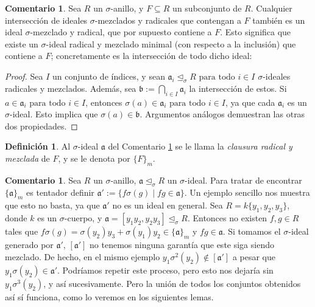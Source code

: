\documentclass[letterpaper]{article}
\def\fa{\text{ para todo }}
\def\a{\mathfrak{a}}
\def\b{\mathfrak{b}}
\def\s{\sigma}
\def\si{\unlhd_{\sigma}}
\theoremstyle{definition}
\newtheorem{rem}[Satz]{Comentario}
\newtheorem{defn}[Satz]{Definici\'on}
\begin{document}
\begin{rem}\label{wmwelldef}
Sea $R$ un $\sigma$-anillo, y $F \subseteq R$ un subconjunto de $R$. Cualquier intersecci\'on de ideales $\sigma$-mezclados y radicales que contengan a $F$ tambi\'en es un ideal $\sigma$-mezclado y radical, que por supuesto contiene a $F$. 
Esto significa que existe un $\sigma$-ideal radical y mezclado minimal (con respecto a la inclusi\'on) que contiene a $F$; concretamente es la intersecci\'on de todo dicho ideal:
\begin{proof}
Sea $I$ un conjunto de \'indices, y sean $\a_i \si R \fa i \in I$ $\sigma$-ideales radicales y mezclados. Adem\'as, sea $\b := \bigcap_{i \in I} \a_i$ la intersecci\'on de estos. Si $a \in \a_i \fa i \in I$, entonces $\s(a) \in \a_i \fa i \in I$, ya que cada $\a_i$ es un $\sigma$-ideal.
Esto implica que $\sigma(a) \in \b$. Argumentos an\'alogos demuestran las otras dos propiedades.
\end{proof}
\end{rem}

\begin{defn}
Al $\sigma$-ideal $\a$ del Comentario \ref{wmwelldef} se le llama la \emph{clausura radical y mezclada} de $F$, y se le denota por $\{F\}_{m}$.
\end{defn}

\begin{rem}\label{remshuffling}
Sea $R$ un $\sigma$-anillo, $\a \si R$ un $\sigma$-ideal. Para tratar de encontrar $\{\a\}_m$ es tentador definir $\a':= \{ f\s(g) \mid fg \in \a \}$. Un ejemplo sencillo nos muestra que esto no basta, ya que $\a'$ no es un ideal en general.
Sea $R=k\{y_1,y_2,y_3\}$, donde $k$ es un $\sigma$-cuerpo, y $\a = [y_1y_2, y_2y_3] \si R$. Entonces no existen $f,g \in R$ tales que $ f \s(g) = \s(y_2)y_3 + \s(y_1)y_2 \in \{\a\}_m$ y $fg \in \a$. 
Si tomamos el $\sigma$-ideal generado por $\a'$, $[\a']$ no tenemos ninguna garant\'ia que este siga siendo mezclado. De hecho, en el mismo ejemplo $y_1\s^2(y_2) \notin [\a']$ a pesar que $y_1 \s(y_2) \in \a'$. 
Podr\'iamos repetir este proceso, pero esto nos dejar\'ia sin $y_1 \s^3(y_2)$, y as\'i sucesivamente. Pero la uni\'on de todos los conjuntos obtenidos as\'i s\'i funciona, como lo veremos en los siguientes lemas.
\end{rem}
\end{document}
